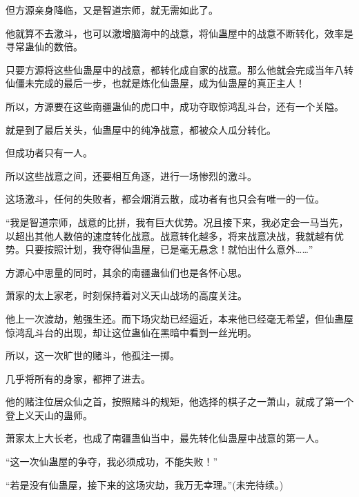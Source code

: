 \begin{this_body}
但方源亲身降临，又是智道宗师，就无需如此了。

他就算不去激斗，也可以激增脑海中的战意，将仙蛊屋中的战意不断转化，效率是寻常蛊仙的数倍。

只要方源将这些仙蛊屋中的战意，都转化成自家的战意。那么他就会完成当年八转仙僵未完成的最后一步，也就是炼化仙蛊屋，成为仙蛊屋的真正主人！

所以，方源要在这些南疆蛊仙的虎口中，成功夺取惊鸿乱斗台，还有一个关隘。

就是到了最后关头，仙蛊屋中的纯净战意，都被众人瓜分转化。

但成功者只有一人。

所以这些战意之间，还要相互角逐，进行一场惨烈的激斗。

这场激斗，任何的失败者，都会烟消云散，成功者有也只会有唯一的一位。

“我是智道宗师，战意的比拼，我有巨大优势。况且接下来，我必定会一马当先，以超出其他人数倍的速度转化战意。战意转化越多，将来战意决战，我就越有优势。只要按照计划，我夺得仙蛊屋，已是毫无悬念！就怕出什么意外……”

方源心中思量的同时，其余的南疆蛊仙们也是各怀心思。

萧家的太上家老，时刻保持着对义天山战场的高度关注。

他上一次渡劫，勉强生还。而下场灾劫已经逼近，本来他已经毫无希望，但仙蛊屋惊鸿乱斗台的出现，却让这位蛊仙在黑暗中看到一丝光明。

所以，这一次旷世的赌斗，他孤注一掷。

几乎将所有的身家，都押了进去。

他的赌注位居众仙之首，按照赌斗的规矩，他选择的棋子之一萧山，就成了第一个登上义天山的蛊师。

萧家太上大长老，也成了南疆蛊仙当中，最先转化仙蛊屋中战意的第一人。

“这一次仙蛊屋的争夺，我必须成功，不能失败！”

“若是没有仙蛊屋，接下来的这场灾劫，我万无幸理。”(未完待续。)

\end{this_body}

